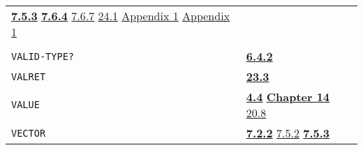 \documentclass[a4paper]{scrbook}
\begin{document}
\begin{longtable}[]{@{}ll@{}}
\begin{minipage}[t]{0.70\columnwidth}
\textbf{\href{07-structured-objects.md\#753-list-vector-uvector-and-string-the-subrs-1}{7.5.3}}
\textbf{\href{07-structured-objects.md\#764-vector-the-primtype-1}{7.6.4}}
\href{07-structured-objects.md\#767-bytes}{7.6.7} \href{24-efficiency-and-tastefulness.md\#241-efficiency}{24.1}
\href{appendix-1-a-look-inside.md\#appendix-1-a-look-inside}{Appendix 1}
\href{appendix-1-a-look-inside.md\#basic-data-structures}{Appendix 1}\strut
\end{minipage}\tabularnewline
\begin{minipage}[t]{0.24\columnwidth}\raggedright\strut
\strut
\end{minipage} & \begin{minipage}[t]{0.70\columnwidth}\raggedright\strut
\strut
\end{minipage}\tabularnewline
\begin{minipage}[t]{0.24\columnwidth}\raggedright\strut
\texttt{VALID-TYPE?}\strut
\end{minipage} & \begin{minipage}[t]{0.70\columnwidth}\raggedright\strut
\textbf{\href{06-data-types.md\#642-valid-type}{6.4.2}}\strut
\end{minipage}\tabularnewline
\begin{minipage}[t]{0.24\columnwidth}\raggedright\strut
\texttt{VALRET}\strut
\end{minipage} & \begin{minipage}[t]{0.70\columnwidth}\raggedright\strut
\textbf{\href{23-mdl-as-a-system-process.md\#233-exits}{23.3}}\strut
\end{minipage}\tabularnewline
\begin{minipage}[t]{0.24\columnwidth}\raggedright\strut
\texttt{VALUE}\strut
\end{minipage} & \begin{minipage}[t]{0.70\columnwidth}\raggedright\strut
\textbf{\href{04-values-of-atoms.md\#44-value}{4.4}}
\textbf{\href{14-data-type-declarations.md\#chapter-14-data-type-declarations}{Chapter 14}}
\href{20-coroutines.md\#208-sneakiness-with-processes}{20.8}\strut
\end{minipage}\tabularnewline
\begin{minipage}[t]{0.24\columnwidth}\raggedright\strut
\texttt{VECTOR}\strut
\end{minipage} & \begin{minipage}[t]{0.70\columnwidth}\raggedright\strut
\textbf{\href{07-structured-objects.md\#722-vector-1}{7.2.2}} \href{07-structured-objects.md\#752-quote-1}{7.5.2}
\textbf{\href{07-structured-objects.md\#753-list-vector-uvector-and-string-the-subrs-1}{7.5.3}}

\end{minipage}
\end{longtable}
\end{document}
